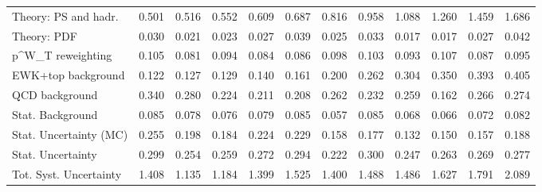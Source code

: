 \begin{tabular}{l|p{0.6cm}p{0.6cm}p{0.6cm}p{0.6cm}p{0.6cm}p{0.6cm}p{0.6cm}p{0.6cm}p{0.6cm}p{0.6cm}p{0.6cm}}
Theory: PS and hadr.                     & 0.501 & 0.516 & 0.552 & 0.609 & 0.687 & 0.816 & 0.958 & 1.088 & 1.260 & 1.459 & 1.686 \\
Theory: PDF                              & 0.030 & 0.021 & 0.023 & 0.027 & 0.039 & 0.025 & 0.033 & 0.017 & 0.017 & 0.027 & 0.042 \\
p^{W}_{T} reweighting                    & 0.105 & 0.081 & 0.094 & 0.084 & 0.086 & 0.098 & 0.103 & 0.093 & 0.107 & 0.087 & 0.095 \\
EWK+top background                       & 0.122 & 0.127 & 0.129 & 0.140 & 0.161 & 0.200 & 0.262 & 0.304 & 0.350 & 0.393 & 0.405 \\
QCD background                           & 0.340 & 0.280 & 0.224 & 0.211 & 0.208 & 0.262 & 0.232 & 0.259 & 0.162 & 0.266 & 0.274 \\
Stat. Background                         & 0.085 & 0.078 & 0.076 & 0.079 & 0.085 & 0.057 & 0.085 & 0.068 & 0.066 & 0.072 & 0.082 \\
Stat. Uncertainty (MC)                   & 0.255 & 0.198 & 0.184 & 0.224 & 0.229 & 0.158 & 0.177 & 0.132 & 0.150 & 0.157 & 0.188 \\
\hline
Stat. Uncertainty                        & 0.299 & 0.254 & 0.259 & 0.272 & 0.294 & 0.222 & 0.300 & 0.247 & 0.263 & 0.269 & 0.277 \\
\hline
Tot. Syst. Uncertainty                   & 1.408 & 1.135 & 1.184 & 1.399 & 1.525 & 1.400 & 1.488 & 1.486 & 1.627 & 1.791 & 2.089 \\
\hline
\end{tabular}

